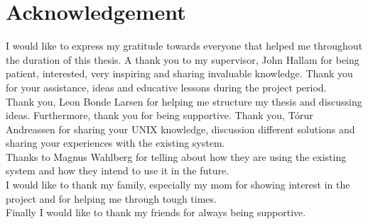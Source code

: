 {\let\clearpage\relax\chapter*{Acknowledgement}}

I would like to express my gratitude towards everyone that helped me throughout the duration of this thesis. A thank you to my supervisor, John Hallam for being patient, interested, very inspiring and sharing invaluable knowledge. Thank you for your assistance, ideas and educative lessons during the project period. \\
Thank you, Leon Bonde Larsen for helping me structure my thesis and discussing ideas. Furthermore, thank you for being supportive.
Thank you, Tórur Andreassen for sharing your UNIX knowledge, discussion different solutions and sharing your experiences with the existing system.\\
Thanks to Magnus Wahlberg for telling about how they are using the existing system and how they intend to use it in the future.\\
I would like to thank my family, especially my mom for showing interest in the project and for helping me through tough times.\\

Finally I would like to thank my friends for always being supportive.



